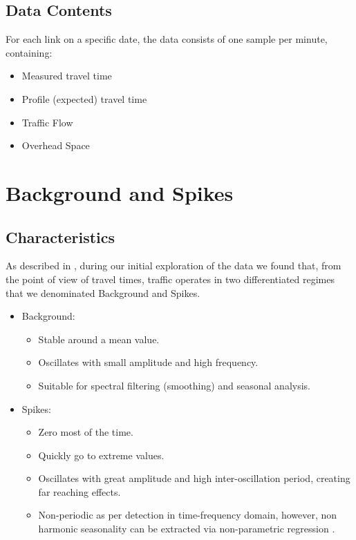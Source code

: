 \documentclass[a4paper, 10pt, conference]{ieeeconf}      %
\begin{document}
\subsection{Data Contents}
For each link on a specific date, the data consists of one sample per minute, containing:
\begin{itemize}
	\item Measured travel time
	\item Profile (expected) travel time 
	\item Traffic Flow
	\item Overhead Space	
\end{itemize}

\section{Background and Spikes}
\subsection{Characteristics}
As described in \cite{ttprofiles}, during our initial exploration of the data we found that, from the point of view of travel times, traffic operates in two differentiated regimes that we denominated Background and Spikes. 
\begin{itemize}
	\item Background: 
	\begin{itemize}
		\item Stable around a mean value.
		\item Oscillates with small amplitude and high frequency.
		\item Suitable for spectral filtering (smoothing) and seasonal analysis.
	\end{itemize}
	\item Spikes: 
	\begin{itemize}
		\item Zero most of the time.
		\item Quickly go to extreme values.
		\item Oscillates with great amplitude and high inter-oscillation period, creating far reaching effects.
		\item Non-periodic as per detection in time-frequency domain, however, non harmonic seasonality can be extracted via non-parametric regression .
	\end{itemize}
\end{itemize}
\end{document}

